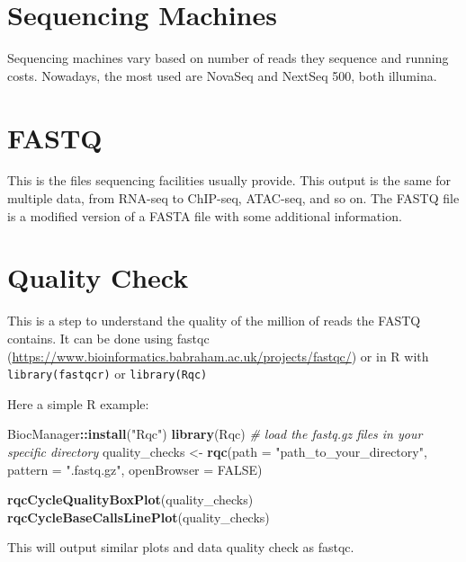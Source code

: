 \documentclass[]{book}
\newenvironment{Shaded}{\begin{snugshade}}{\end{snugshade}}
\newcommand{\CommentTok}[1]{\textcolor[rgb]{0.56,0.35,0.01}{\textit{#1}}}
\newcommand{\DataTypeTok}[1]{\textcolor[rgb]{0.13,0.29,0.53}{#1}}
\newcommand{\KeywordTok}[1]{\textcolor[rgb]{0.13,0.29,0.53}{\textbf{#1}}}
\newcommand{\NormalTok}[1]{#1}
\newcommand{\OperatorTok}[1]{\textcolor[rgb]{0.81,0.36,0.00}{\textbf{#1}}}
\newcommand{\OtherTok}[1]{\textcolor[rgb]{0.56,0.35,0.01}{#1}}
\newcommand{\StringTok}[1]{\textcolor[rgb]{0.31,0.60,0.02}{#1}}
\begin{document}
\hypertarget{sequencing-machines}{%
\section{Sequencing Machines}\label{sequencing-machines}}

Sequencing machines vary based on number of reads they sequence and running costs. Nowadays, the most used are NovaSeq and NextSeq 500, both illumina.

\hypertarget{fastq}{%
\section{FASTQ}\label{fastq}}

This is the files sequencing facilities usually provide. This output is the same for multiple data, from RNA-seq to ChIP-seq, ATAC-seq, and so on. The FASTQ file is a modified version of a FASTA file with some additional information.

\hypertarget{quality-check}{%
\section{Quality Check}\label{quality-check}}

This is a step to understand the quality of the million of reads the FASTQ contains.
It can be done using fastqc (\url{https://www.bioinformatics.babraham.ac.uk/projects/fastqc/}) or in R with \texttt{library(fastqcr)} or \texttt{library(Rqc)}

Here a simple R example:

\begin{Shaded}
\begin{Highlighting}[]
\NormalTok{BiocManager}\OperatorTok{::}\KeywordTok{install}\NormalTok{(}\StringTok{"Rqc"}\NormalTok{)}
\KeywordTok{library}\NormalTok{(Rqc)}
\CommentTok{# load the fastq.gz files in your specific directory}
\NormalTok{quality_checks <-}\StringTok{ }\KeywordTok{rqc}\NormalTok{(}\DataTypeTok{path =} \StringTok{"path_to_your_directory"}\NormalTok{, }\DataTypeTok{pattern =} \StringTok{".fastq.gz"}\NormalTok{, }
  \DataTypeTok{openBrowser =} \OtherTok{FALSE}\NormalTok{)}

\KeywordTok{rqcCycleQualityBoxPlot}\NormalTok{(quality_checks)}
\KeywordTok{rqcCycleBaseCallsLinePlot}\NormalTok{(quality_checks)}
\end{Highlighting}
\end{Shaded}

This will output similar plots and data quality check as fastqc.
\end{document}
